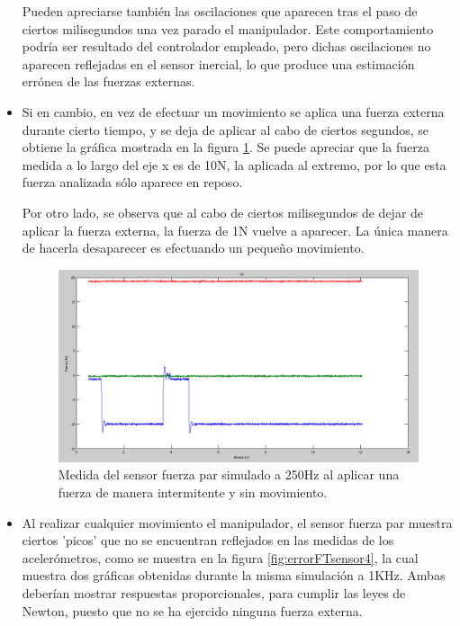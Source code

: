 \begin{itemize}
Pueden apreciarse también las oscilaciones que aparecen tras el paso de ciertos milisegundos una vez parado el manipulador. Este comportamiento podría ser resultado del controlador empleado, pero dichas oscilaciones no aparecen reflejadas en el sensor inercial, lo que produce una estimación errónea de las fuerzas externas. \par 

\item Si en cambio, en vez de efectuar un movimiento se aplica una fuerza externa durante cierto tiempo, y se deja de aplicar al cabo de ciertos segundos, se obtiene la gráfica mostrada en la figura \ref{fig:errorFTsensor3}. Se puede apreciar que la fuerza medida a lo largo del eje x es de 10N, la aplicada al extremo, por lo que esta fuerza analizada sólo aparece en reposo. \par 

Por otro lado, se observa que al cabo de ciertos milisegundos de dejar de aplicar la fuerza externa, la fuerza de 1N vuelve a aparecer. La única manera de hacerla desaparecer es efectuando un pequeño movimiento. \par 

\begin{figure}[h!]
\centering
\includegraphics[scale=0.5]{Figuras/FTerror3}
\caption{Medida del sensor fuerza par simulado a 250Hz al aplicar una fuerza de manera intermitente y sin movimiento.}
\label{fig:errorFTsensor3}
\end{figure}

\item Al realizar cualquier movimiento el manipulador, el sensor fuerza par muestra ciertos 'picos' que no se encuentran reflejados en las medidas de los acelerómetros, como se muestra en la figura \ref{fig:errorFTsensor4}, la cual muestra dos gráficas obtenidas durante la misma simulación a 1KHz. Ambas deberían mostrar respuestas proporcionales, para cumplir las leyes de Newton, puesto que no se ha ejercido ninguna fuerza externa. \par 


\end{itemize}
